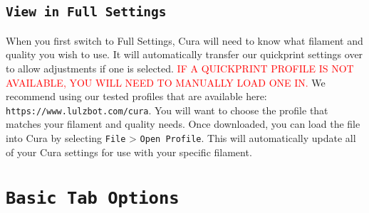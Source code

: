 
\subsection{\texttt{View in Full Settings}}
When you first switch to Full Settings, Cura will need to know what filament and quality you wish to use. It will automatically transfer our quickprint settings over to allow adjustments if one is selected. \textcolor{red}{IF A QUICKPRINT PROFILE IS NOT AVAILABLE, YOU WILL NEED TO MANUALLY LOAD ONE IN.} We recommend using our tested profiles that are available here: \texttt{https://www.lulzbot.com/cura}. You will want to choose the profile that matches your filament and quality needs. Once downloaded, you can load the file into Cura by selecting \texttt{File} > \texttt{Open Profile}. This will automatically update all of your Cura settings for use with your specific filament.

\section{\texttt{Basic Tab Options}}

